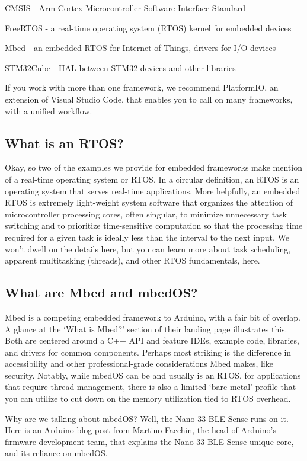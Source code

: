CMSIS - Arm Cortex Microcontroller Software Interface Standard

FreeRTOS - a real-time operating system (RTOS) kernel for embedded devices

Mbed - an embedded RTOS for Internet-of-Things, drivers for I/O devices

STM32Cube - HAL between STM32 devices and other libraries

If you work with more than one framework, we recommend PlatformIO, an extension of Visual Studio Code, that enables you to call on many frameworks, with a unified workflow.

\subsection{What is an RTOS?}

Okay, so two of the examples we provide for embedded frameworks make mention of a real-time operating system or RTOS. In a circular definition, an RTOS is an operating system that serves real-time applications. More helpfully, an embedded RTOS is extremely light-weight system software that organizes the attention of microcontroller processing cores, often singular, to minimize unnecessary task switching and to prioritize time-sensitive computation so that the processing time required for a given task is ideally less than the interval to the next input. We won’t dwell on the details here, but you can learn more about task scheduling, apparent multitasking (threads), and other RTOS fundamentals, here.

\subsection{What are Mbed and mbedOS?}

Mbed is a competing embedded framework to Arduino, with a fair bit of overlap. A glance at the ‘What is Mbed?’ section of their landing page illustrates this. Both are centered around a C++ API and feature IDEs, example code, libraries, and drivers for common components. Perhaps most striking is the difference in accessibility and other professional-grade considerations Mbed makes, like security. Notably, while mbedOS can be and usually is an RTOS, for applications that require thread management, there is also a limited ‘bare metal’ profile that you can utilize to cut down on the memory utilization tied to RTOS overhead.

Why are we talking about mbedOS? Well, the Nano 33 BLE Sense runs on it. Here is an Arduino blog post from Martino Facchin, the head of Arduino’s firmware development team, that explains the Nano 33 BLE Sense unique core, and its reliance on mbedOS.

